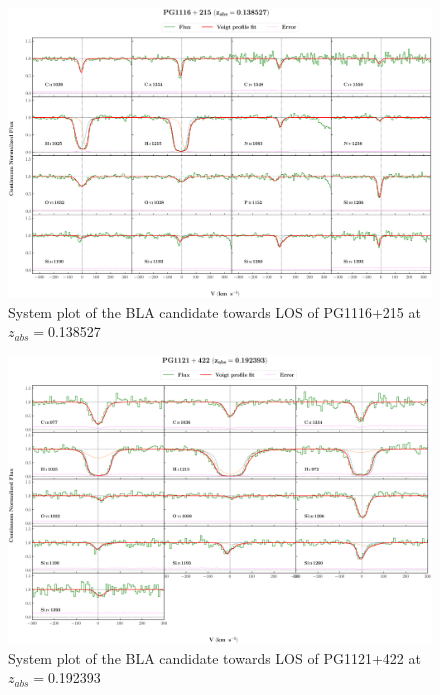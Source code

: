 \begin{landscape}
\begin{figure} 
  \centering  
  \hspace*{-21mm}
    \includegraphics[width=\linewidth]{Figures//system-plots/PG1116+215_z=0.138527_sys_plot.png} 
  \caption{System plot of the BLA candidate towards LOS of PG1116+215 at $z_{abs}=$0.138527} 
\end{figure}



\begin{figure} 
  \centering  
  \hspace*{-21mm}
    \includegraphics[width=\linewidth]{Figures//system-plots/PG1121+422_z=0.192393_sys_plot.png} 
  \caption{System plot of the BLA candidate towards LOS of PG1121+422 at $z_{abs}=$0.192393} 
\end{figure}




\end{landscape}
